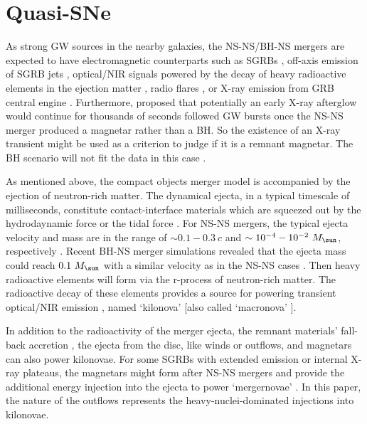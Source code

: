 \documentclass[a4paper,fleqn,usenatbib]{mnras}
\begin{document}
\section{Quasi-SNe}

As strong GW sources in the nearby galaxies, the NS-NS/BH-NS mergers are expected to have electromagnetic counterparts such as SGRBs \citep[e.g.,][]{Eichler1989,Nakar2007,Berger2014,Kumar2015,Levan2016}, off-axis emission of SGRB jets \citep[e.g.,][]{Rhoads1999,Lazzati2017,Xiao2017}, optical/NIR signals powered by the decay of heavy radioactive elements in the ejection matter \citep[e.g.,][]{Li1998, Metzger2017}, radio flares \citep[e.g.,][]{Nakar2011,Gao2013,Piran2013}, or X-ray emission from GRB central engine \citep[e.g.,][]{Nakamura2014,Kisaka2015}. Furthermore, \citet[]{Zhang2013} proposed that potentially an early X-ray afterglow would continue for thousands of seconds followed GW bursts once the NS-NS merger produced a magnetar rather than a BH. So the existence of an X-ray transient might be used as a criterion to judge if it is a remnant magnetar. The BH scenario will not fit the data in this case \citep[]{Sun2017}.

As mentioned above, the compact objects merger model is accompanied by the ejection of neutron-rich matter. The dynamical ejecta, in a typical timescale of milliseconds, constitute contact-interface materials which are squeezed out by the hydrodaynamic force \citep[e.g.,][]{Oechslin2007,Bauswein2013,Hotokezaka2013} or the tidal force \citep[e.g.,][]{Kawaguchi2015}. For NS-NS mergers, the typical ejecta velocity and mass are in the range of $\sim 0.1-0.3~c$ and $\sim 10^{-4}-10^{-2}~M_{\rm \sun}$, respectively \citep[e.g.,][]{Hotokezaka2013}. Recent BH-NS merger simulations revealed that the ejecta mass could reach $0.1~M_{\rm \sun}$ with a similar velocity as in the NS-NS cases \citep[]{Kawaguchi2015,Kawaguchi2016}. Then heavy radioactive elements will form via the r-process of neutron-rich matter. The radioactive decay of these elements provides a source for powering transient optical/NIR emission \citep[]{Eichler1989,Li1998}, named `kilonova' \citep[]{Kulkarni2005} [also called `macronova' \citep[]{Metzger2010}].

In addition to the radioactivity of the merger ejecta, the remnant materials' fall-back accretion \citep[e.g.,][]{Rosswog2007,Rossi2009,Chawla2010,Kyutoku2015}, the ejecta from the disc, like winds \citep[e.g.,][]{Metzger2012,Ma2018} or outflows, and magnetars \citep[e.g.,][]{Zhang2013,Gao2013,Yu2013,Metzger2014,Gao2015,Gao2017b,Yi2017,Yi2018} can also power kilonovae. For some SGRBs with extended emission or internal X-ray plateaus, the magnetars might form after NS-NS mergers and provide the additional energy injection into the ejecta to power `mergernovae' \citep[e.g.,][]{Yu2013}. In this paper, the nature of the outflows represents the heavy-nuclei-dominated injections into kilonovae.
\end{document}

